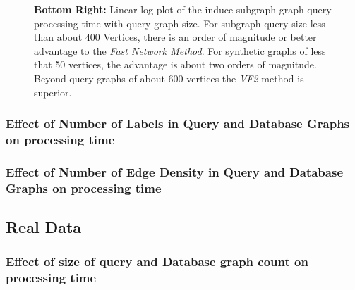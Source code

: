 \begin{figure}[h]
{\textbf{Bottom Right:} Linear-log plot of the induce subgraph graph query processing time with query graph size. For subgraph query size less than about 400 Vertices, there is an order of magnitude or better advantage to the \textit{Fast Network Method}. For synthetic graphs of less that 50 vertices, the advantage is about two orders of magnitude. Beyond query graphs of about 600 vertices the \textit{VF2} method is superior.
}
\label{fig:fig91}
\end{figure}


\subsubsection{Effect of Number of Labels in Query and Database Graphs on processing time}

\subsubsection{Effect of Number of Edge Density in Query and Database Graphs on processing time}

\subsection{Real Data}

\subsubsection{Effect of size of query and Database graph count on processing time}


